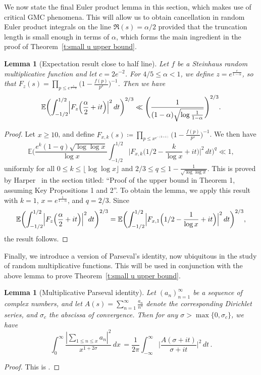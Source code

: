 \documentclass[12pt,a4paper,reqno]{amsart}
\numberwithin{equation}{section}
\def\E{\mathbb E}
\def\leq {\leqslant}
\newtheorem{lemma}[theorem]{Lemma}
\theoremstyle{remark}
\theoremstyle{definition}
\numberwithin{equation}{section}
\theoremstyle{remark}
\def\E{\mathbb E}
\begin{document}
We now state the final Euler product lemma in this section, which makes use of critical GMC phenomena. This will allow us to obtain cancellation in random Euler product integrals on the line $\Re (s) = \alpha/2$ provided that the truncation length is small enough in terms of $\alpha$, which forms the main ingredient in the proof of Theorem~\ref{t:small u upper bound}.
\begin{lemma}[Expectation result close to half line]\label{l:Euler product on half line}
Let $f$ be a Steinhaus random multiplicative function and let $c = 2e^{-2}$. For $4/5 \leq \alpha < 1$, we define $z = e^\frac{c}{1 - \alpha}$, so that $F_{z} (s) = \prod_{p \leq e^{\frac{c}{1 - \alpha}}} \bigl( 1 - \frac{f(p)}{p^{s}} \bigr)^{-1}$. Then we have
\[
\E \biggl( \int_{-1/2}^{1/2} \Bigl| F_{z} \Bigl( \frac{\alpha}{2} + it \Bigr) \Bigr|^2 \, dt \biggr)^{2/3} \ll \Biggl( \frac{1}{(1 - \alpha) \sqrt{\log \frac{1}{1 - \alpha}}} \Biggr)^{2/3} .
\]
\end{lemma}
\begin{proof}
Let $x \geq 10$, and define $F_{x, k} (s) \coloneqq \prod_{p \leq x^{e^{-(k+1)}}} \bigl( 1 - \frac{f(p)}{p^s} \bigr)^{-1}$. We then have
\[
\E \Biggl( \frac{e^{k} (1-q) \sqrt{\log \log x}}{\log x} \int_{-1/2}^{1/2} \biggl| F_{x, k} \biggl( 1/2  - \frac{k}{\log x} + it \biggr) \biggr|^2 \, dt \Biggr)^q \ll 1 ,
\]
uniformly for all $0 \leq k \leq \lfloor \log \log x \rfloor$ and $2/3 \leq q \leq 1 - \frac{1}{\sqrt{\log \log x}}$. This is proved by Harper~\cite{HarperLow} in the section titled: ``Proof of the upper bound in Theorem 1, assuming Key Propositions 1 and 2''. To obtain the lemma, we apply this result with $k=1$, $x=e^{\frac{1}{1 - \alpha}}$, and $q = 2/3$. Since
\[
    \E \biggl( \int_{-1/2}^{1/2} \Bigl| F_{z} \Bigl( \frac{\alpha}{2} + it \Bigr) \Bigr|^2 \, dt \biggr)^{2/3} = \E \biggl( \int_{-1/2}^{1/2} \Bigl| F_{x, 1} \Bigl( 1/2 - \frac{1}{\log x} + it \Bigr) \Bigr|^2 \, dt \biggr)^{2/3},
\]
the result follows.
\end{proof}

Finally, we introduce a version of Parseval's identity, now ubiquitous in the study of random multiplicative functions. This will be used in conjunction with the above lemma to prove Theorem~\ref{t:small u upper bound}.
\begin{lemma}[Multiplicative Parseval identity]\label{l:ha result}
Let $(a_n)_{n=1}^\infty$ be a sequence of complex numbers, and let $A(s) = \sum_{n=1}^\infty \frac{a_n}{n^s}$ denote the corresponding Dirichlet series, and $\sigma_c$ the abscissa of convergence. Then for any $\sigma > \max\{ 0, \sigma_c \}$, we have \[ \int_0^\infty \frac{|\sum_{1\leq n \leq x} a_n|^2}{x^{1 + 2 \sigma}} \, dx \, = \frac{1}{2\pi} \int_{-\infty}^{\infty} \biggl| \frac{A(\sigma + i t)}{\sigma + it} \biggr|^2 \, dt \, . \]
\end{lemma} 
\begin{proof}
This is \cite[Equation~(5.26)]{MV2007}.
\end{proof}
\end{document}
